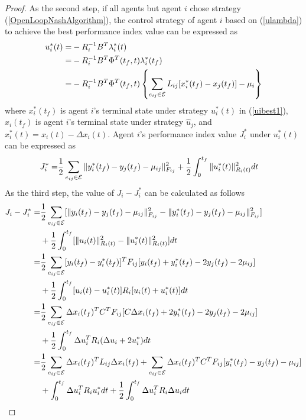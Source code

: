\documentclass[12pt,draftcls,onecolumn]{IEEEtran}  %
\begin{document}
\begin{proof}
As the second step, if all agents but agent $i$ chose strategy (\ref{OpenLoopNashAlgorithm}), the control strategy of agent $i$ based on (\ref{ulambda}) to achieve the best performance index value can be expressed as
\begin{align}
u^*_i(t)=&-R_i^{-1}B^T\lambda^*_i(t)\notag\\
=&-R_i^{-1}B^T\Phi^T(t_f,t)\lambda^*_i(t_f)\notag\\
=&-R_i^{-1}B^T\Phi^T(t_f,t)\left\{\sum_{e_{ij}\in\mathcal{E}} L_{ij}[x^*_i(t_f)-x_j(t_f)]-\mu_i\right\}\label{uibest1}
\end{align}
where $x^*_i(t_f)$ is agent $i$'s terminal state under strategy $u_i^*(t)$ in (\ref{uibest1}), $x_i(t_f)$ is agent $i$'s terminal state under strategy $\hat{u}_j$, and $x_i^*(t)=x_i(t)-\Delta x_i(t)$. Agent $i$'s performance index value $J_i^*$ under $u_i^*(t)$ can be expressed as
\begin{align}
J_i^*=&\frac{1}{2}\sum_{e_{ij}\in\mathcal{E}} \|y^*_i(t_f)-y_j(t_f)-\mu_{ij}\|^2_{F_{ij}} +\frac{1}{2}\int_{0}^{t_f} \|u^*_i(t)\|^2_{R_i(t)}dt\notag
\end{align}
As the third step, the value of $J_i-J_i^*$ can be calculated as follows 
\begin{align}
J_i-J_i^*=&\frac{1}{2}\sum_{e_{ij}\in\mathcal{E}} [\|y_i(t_f)-y_j(t_f)-\mu_{ij}\|^2_{F_{ij}}-\|y_i^*(t_f)-y_j(t_f)-\mu_{ij}\|^2_{F_{ij}} ]\notag\\
&+\frac{1}{2}\int_{0}^{t_f} [\|u_i(t)\|^2_{R_i(t)}-\|u_i^*(t)\|^2_{R_i(t)}]dt\notag\\
=& \frac{1}{2}\sum_{e_{ij}\in\mathcal{E}} [y_i(t_f)-y^*_i(t_f)]^TF_{ij}[y_i(t_f)+y_i^*(t_f)-2y_j(t_f)-2\mu_{ij}]\notag\\
&+\frac{1}{2}\int_{0}^{t_f}[u_i(t)-u_i^*(t)]R_i[u_i(t)+u^*_i(t)]dt\notag\\
=& \frac{1}{2}\sum_{e_{ij}\in\mathcal{E}}\Delta x_i(t_f)^TC^TF_{ij}[C\Delta x_i(t_f)+2y_i^*(t_f)-2y_j(t_f)-2\mu_{ij}]\notag\\
&+\frac{1}{2}\int^{t_f}_0\Delta u_i^TR_i(\Delta u_i+2 u_i^*)dt\notag\\
=&\frac{1}{2}\sum_{e_{ij}\in\mathcal{E}}\Delta x_i(t_f)^TL_{ij}\Delta x_i(t_f)+\sum_{e_{ij}\in\mathcal{E}}\Delta x_i(t_f)^TC^TF_{ij}[y_i^*(t_f)-y_j(t_f)-\mu_{ij}]\notag\\
&+\int^{t_f}_0\Delta u_i^TR_i u_i^*dt+\frac{1}{2}\int^{t_f}_0\Delta u_i^TR_i\Delta u_idt
\label{JiJistar}
\end{align}

\end{proof}
\end{document}
